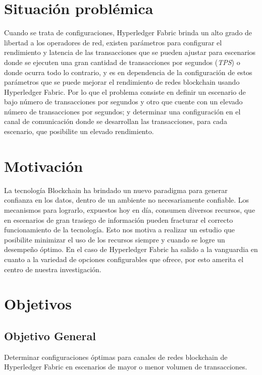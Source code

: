 \section{Situaci\'on probl\'emica}
Cuando se trata de configuraciones, Hyperledger Fabric brinda un alto grado de libertad a los operadores de red, existen par\'ametros para configurar el rendimiento y latencia de las transacciones que se pueden ajustar para escenarios donde se ejecuten una gran cantidad de transacciones por segundos (\emph{TPS}) o donde ocurra todo lo contrario, y es en dependencia de la configuraci\'on de estos par\'ametros que se puede mejorar el rendimiento de redes blockchain usando Hyperledger Fabric. 
Por lo que el problema consiste en definir un escenario de bajo n\'umero de transacciones por segundos y otro que cuente con un elevado n\'umero de transacciones por segundos; y determinar una configuraci\'on en el canal de comunicaci\'on donde se desarrollan las transacciones, para cada escenario, que posibilite un elevado rendimiento.

\section{Motivaci\'on}
La tecnolog\'ia Blockchain ha brindado un nuevo paradigma para generar confianza en los datos, dentro de un ambiente no necesariamente confiable. Los mecanismos para lograrlo, expuestos hoy en d\'ia, consumen diversos recursos, que en escenarios de gran trasiego de informaci\'on pueden fracturar el correcto funcionamiento de la tecnolog\'ia. Esto nos motiva a realizar un estudio que posibilite minimizar el uso de los recursos siempre y cuando se logre un desempe\~no \'optimo. En el caso de Hyperledger Fabric ha salido a la vanguardia en cuanto a la variedad de opciones configurables que ofrece, por esto amerita el centro de nuestra investigaci\'on.


\section{Objetivos}
\subsection{Objetivo General}
Determinar configuraciones \'optimas para canales de redes blockchain de Hyperledger Fabric en escenarios de mayor o menor volumen de transacciones.

{\vspace{0.5 cm}}

